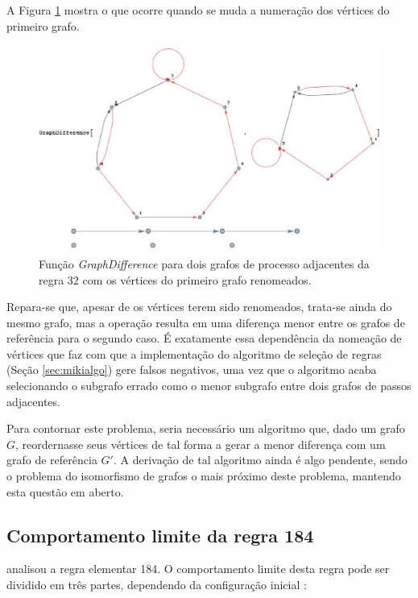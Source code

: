 \documentclass[12pt,a4paper]{article}
\begin{document}
A Figura \ref{fig:gd2} mostra o que ocorre quando se muda a numeração
dos vértices do primeiro grafo.

\begin{figure}[htp]
\begin{center}
\includegraphics[scale=0.37]{img/GraphDifference2.eps}
\caption{Função \textit{GraphDifference} para dois grafos de processo
adjacentes da regra 32 com os vértices do primeiro grafo renomeados.}
\label{fig:gd2}
\end{center}
\end{figure}

Repara-se que, apesar de os vértices terem sido renomeados, trata-se ainda do
mesmo grafo, mas a operação resulta em uma diferença
menor entre os grafos de referência para o segundo caso. É exatamente essa
dependência da nomeação de vértices que faz com que a implementação do
algoritmo de seleção de regras (Seção \ref{sec:mikialgo}) gere falsos negativos,
uma vez que o algoritmo acaba selecionando o subgrafo errado como o menor
subgrafo entre dois grafos de passos adjacentes.

Para contornar este problema, seria necessário um algoritmo que, dado
um grafo $G$, reordernasse seus vértices de tal forma a gerar a menor
diferença com um grafo de referência $G'$. A derivação de tal algoritmo
ainda é algo pendente, sendo o problema do isomorfismo de grafos o mais
próximo deste problema, mantendo esta questão em aberto.

\subsection{Comportamento limite da regra 184}\label{sec:limit184}

 analisou a regra elementar 184. O comportamento
limite desta regra pode ser dividido em três partes, dependendo da
configuração inicial :
\end{document}

